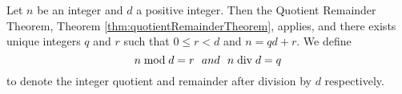 \guard



\begin{defn}
\label{defn:mod}
\label{defn:div}
  Let $n$ be an integer and $d$ a positive integer.
  Then the Quotient Remainder Theorem, Theorem \ref{thm:quotientRemainderTheorem}, applies, and there exists unique integers $q$ and $r$ such that $0\leq r<d$ and $n=qd+r$.
  We define \[n\bmod d = r\text~~{ and }~~n\bdiv d = q\] to denote the integer quotient and remainder after division by $d$ respectively.
\end{defn}
